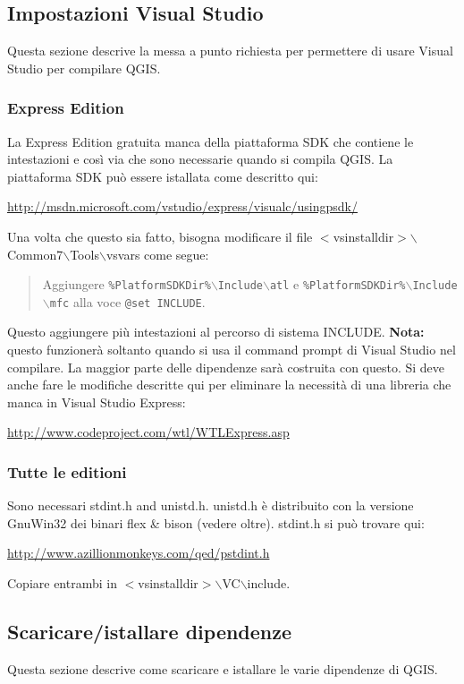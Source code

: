 \subsection{Impostazioni Visual Studio}
Questa sezione descrive la messa a punto richiesta per permettere di usare Visual Studio per compilare QGIS. 

\subsubsection{Express Edition}
La Express Edition gratuita manca della piattaforma SDK che contiene le intestazioni e così via che sono necessarie quando si compila QGIS. La piattaforma SDK può essere istallata come descritto qui:


\url{http://msdn.microsoft.com/vstudio/express/visualc/usingpsdk/}

Una volta che questo sia fatto, bisogna modificare il file $<$vsinstalldir$>$$\backslash$Common7$\backslash$Tools$\backslash$vsvars come segue:

	\begin{quotation}
Aggiungere \texttt{\%PlatformSDKDir\%$\backslash$Include$\backslash$atl} e \texttt{\%PlatformSDKDir\%$\backslash$Include$\backslash$mfc} alla voce \texttt{@set INCLUDE}.
	\end{quotation}
Questo aggiungere più intestazioni al percorso di sistema INCLUDE. \textbf{Nota:} questo funzionerà soltanto quando si usa il command prompt di Visual Studio nel compilare. La maggior parte delle dipendenze sarà costruita con questo. Si deve anche fare le modifiche descritte qui per eliminare la necessità di una libreria che manca in Visual Studio Express:

\url{http://www.codeproject.com/wtl/WTLExpress.asp}


\subsubsection{Tutte le editioni}
Sono necessari stdint.h and unistd.h. unistd.h è distribuito con la versione GnuWin32 dei binari flex \& bison (vedere oltre). stdint.h si può trovare qui:

\url{http://www.azillionmonkeys.com/qed/pstdint.h}

Copiare entrambi in $<$vsinstalldir$>$$\backslash$VC$\backslash$include.

\subsection{Scaricare/istallare dipendenze}
Questa sezione descrive come scaricare e istallare le varie dipendenze di QGIS.

